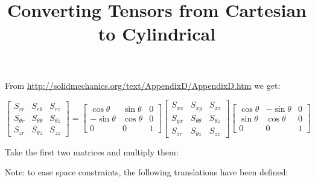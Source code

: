 \documentclass{article}
\begin{document}
\title{Converting Tensors from Cartesian to Cylindrical}
\maketitle

From \url{http://solidmechanics.org/text/AppendixD/AppendixD.htm} we get:

\begin{equation}
    \begin{bmatrix}
    S_{rr} & S_{r\theta} & S_{rz} \\
    S_{\theta r} & S_{\theta\theta} & S_{\theta z} \\
    S_{zr} & S_{\theta z} & S_{zz}
    \end{bmatrix}
    =
    \begin{bmatrix}
        \cos \theta & \sin \theta & 0\\
        -\sin \theta & \cos \theta & 0 \\
        0 & 0 & 1
    \end{bmatrix}
    \begin{bmatrix}
    S_{xx} & S_{xy} & S_{xz} \\
    S_{yx} & S_{\theta\theta} & S_{\theta z} \\
    S_{zr} & S_{\theta z} & S_{zz}
    \end{bmatrix}
    \begin{bmatrix}
        \cos \theta & -\sin \theta & 0\\
        \sin \theta & \cos \theta & 0 \\
        0 & 0 & 1
    \end{bmatrix}
\end{equation}

Take the first two matrices and multiply them:

Note: to ease space constraints, the following translations have been defined:
\end{document}
